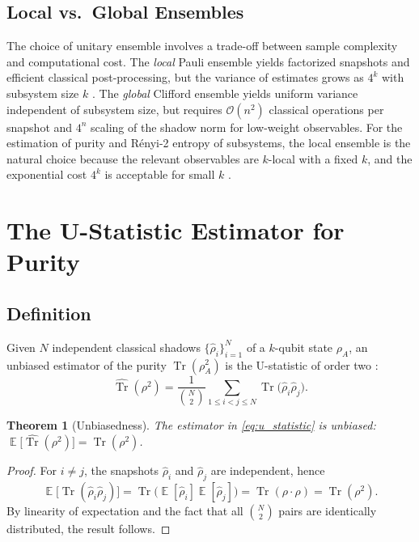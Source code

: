 \documentclass[12pt,a4paper,oneside]{book}
\theoremstyle{plain}
\newtheorem{theorem}{Theorem}[chapter]
\theoremstyle{definition}
\theoremstyle{remark}
\DeclareMathOperator{\E}{\mathbb{E}}
\begin{document}
\subsection{Local vs.\ Global Ensembles}

The choice of unitary ensemble involves a trade-off between sample complexity and computational cost. The \emph{local} Pauli ensemble yields factorized snapshots and efficient classical post-processing, but the variance of estimates grows as $4^k$ with subsystem size $k$ \cite{huang2020predicting}. The \emph{global} Clifford ensemble yields uniform variance independent of subsystem size, but requires $\mathcal{O}(n^2)$ classical operations per snapshot and $4^n$ scaling of the shadow norm for low-weight observables. For the estimation of purity and R\'enyi-2 entropy of subsystems, the local ensemble is the natural choice because the relevant observables are $k$-local with a fixed $k$, and the exponential cost $4^k$ is acceptable for small $k$ \cite{elben2020cross, brydges2019probing}.

\section{The U-Statistic Estimator for Purity}
\label{sec:u_statistic}

\subsection{Definition}

Given $N$ independent classical shadows $\{\hat{\rho}_i\}_{i=1}^{N}$ of a $k$-qubit state $\rho_A$, an unbiased estimator of the purity $\operatorname{Tr}(\rho_A^2)$ is the U-statistic of order two \cite{huang2020predicting, elben2020cross}:
\begin{equation}
    \label{eq:u_statistic}
    \widehat{\operatorname{Tr}}(\rho^2) = \frac{1}{\binom{N}{2}} \sum_{1 \leq i < j \leq N} \operatorname{Tr}\bigl(\hat{\rho}_i \hat{\rho}_j\bigr).
\end{equation}

\begin{theorem}[Unbiasedness]\label{thm:unbiasedness}
The estimator in \cref{eq:u_statistic} is unbiased: $\E\bigl[\widehat{\operatorname{Tr}}(\rho^2)\bigr] = \operatorname{Tr}(\rho^2)$.
\end{theorem}

\begin{proof}
For $i \neq j$, the snapshots $\hat{\rho}_i$ and $\hat{\rho}_j$ are independent, hence
\begin{equation}
    \E\bigl[\operatorname{Tr}(\hat{\rho}_i \hat{\rho}_j)\bigr] = \operatorname{Tr}\bigl(\E[\hat{\rho}_i] \E[\hat{\rho}_j]\bigr) = \operatorname{Tr}(\rho \cdot \rho) = \operatorname{Tr}(\rho^2).
\end{equation}
By linearity of expectation and the fact that all $\binom{N}{2}$ pairs are identically distributed, the result follows.
\end{proof}
\end{document}
